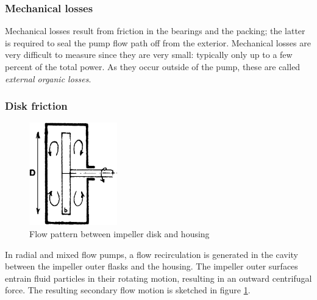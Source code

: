 \subsubsection{Mechanical losses}

Mechanical losses result from friction in the bearings and the
packing; the latter is required to seal the pump flow path off from
the exterior. Mechanical losses are very difficult to measure since
they are very small: typically only up to a few percent of the total
power. As they occur outside of the pump, these are called
\emph{external organic losses}.

\subsubsection{Disk friction}

\begin{figure}
  \includegraphics[width=0.34\textwidth]{pumps/diskFriction.png}
  \caption{Flow pattern between impeller disk and housing}
  \label{fig:diskFriction}
\end{figure} 
In radial and mixed flow pumps, a flow recirculation is generated in
the cavity between the impeller outer flasks and the housing. The
impeller outer surfaces entrain fluid particles in their rotating
motion, resulting in an outward centrifugal force. The resulting
secondary flow motion is sketched in figure \ref{fig:diskFriction}.


